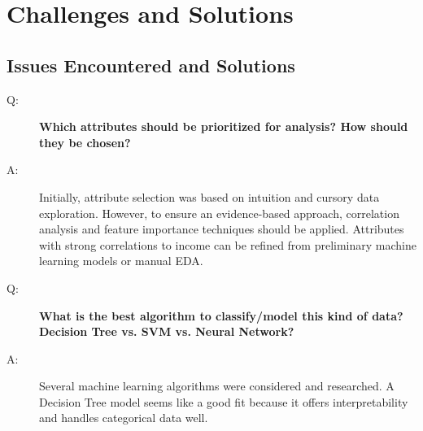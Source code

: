 \documentclass[journal]{IEEEtran}
\begin{document}
\section{Challenges and Solutions}

\subsection{Issues Encountered and Solutions}

\begin{description}
    \item[Q:] \textbf{Which attributes should be prioritized for analysis? How should they be chosen?}
    \item[A:] Initially, attribute selection was based on intuition and cursory data exploration. However, to ensure an evidence-based approach, correlation analysis and feature importance techniques should be applied. Attributes with strong correlations to income can be refined from preliminary machine learning models or manual EDA.

    \item[Q:] \textbf{What is the best algorithm to classify/model this kind of data? Decision Tree vs. SVM vs. Neural Network?}
    \item[A:] Several machine learning algorithms were considered and researched. A Decision Tree model seems like a good fit because it offers interpretability and handles categorical data well.

\end{description}
\end{document}
